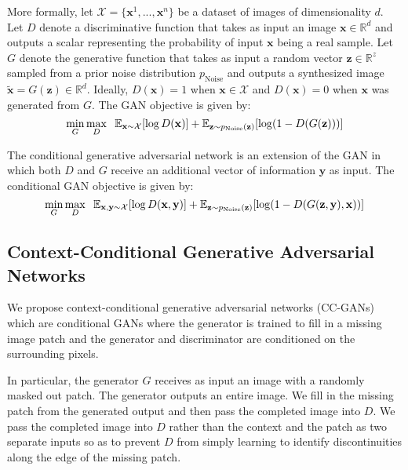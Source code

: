 \documentclass{article} %
\newcommand{\pnoise}{p_{\text{Noise}}}
\newcommand{\R}{\mathbb {R}}
\begin{document}
More formally, let $\mathcal{X} = \{\mathbf{x}^1, ..., \mathbf{x}^n\}$ be a dataset of images of dimensionality $d$.
Let $D$ denote a discriminative function that takes as input an image $\mathbf{x} \in \R^d$ and outputs a scalar representing the probability  of input $\mathbf{x}$ being a real sample.
Let $G$ denote the generative function that takes as input a random vector $\mathbf{z} \in \R^z$ sampled from a prior noise distribution $\pnoise$ and outputs a synthesized image $\mathbf{\tilde{x}} = G(\mathbf{z}) \in \R^d$. Ideally, $D(\mathbf{x}) = 1$ when $\mathbf{x} \in \mathcal{X}$ and $D(\mathbf{x}) = 0$ when $\mathbf{x}$ was generated from $G$.
The GAN objective is given by:
\begin{equation}
\label{eqn:gan}
\min_G \max_D \hspace{2mm} \mathbb{E}_{\mathbf{x}\sim \mathcal{X}}[\log D(\mathbf{x})]  +
\mathbb{E}_{\mathbf{z} \sim \pnoise(\mathbf{z})} [\log(1 - D(G(\mathbf{z})))]
\end{equation}

The conditional generative adversarial network \citep{mirza14} is an extension of the GAN in which both $D$ and $G$ receive an additional vector of information $\mathbf{y}$ as input. The conditional GAN objective is given by:
\begin{equation}
\label{eqn:cgan}
\min_G \max_D \hspace{2mm} \mathbb{E}_{\mathbf{x, y}\sim \mathcal{X}}[\log D(\mathbf{x, y})]  +
\mathbb{E}_{\mathbf{z} \sim \pnoise(\mathbf{z})} [\log(1 - D(G(\mathbf{z, y}), \mathbf{x}))]
\end{equation}\subsection{Context-Conditional Generative Adversarial Networks}
We propose context-conditional generative adversarial networks (CC-GANs) which are
conditional GANs where the generator is trained to
fill in a missing image patch and the generator and discriminator are
conditioned on the surrounding pixels. 

In particular, the generator $G$ receives as input an image with a
randomly masked out patch.  The generator outputs an entire image. 
We fill in the missing patch from the generated output and then pass the completed image
into $D$.  
We pass the completed image into $D$ rather than the context and the patch as two separate inputs so as to prevent $D$ from simply learning to identify discontinuities along the edge of the missing patch.
\end{document}

